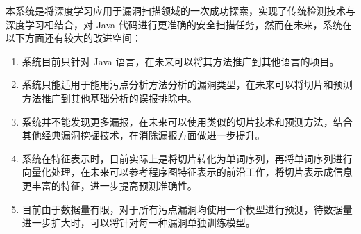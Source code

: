 本系统是将深度学习应用于漏洞扫描领域的一次成功探索，实现了传统检测技术与深度学习相结合，对 Java 代码进行更准确的安全扫描任务，然而在未来，系统在以下方面还有较大的改进空间：

\begin{enumerate}
    \item 系统目前只针对 Java 语言，在未来可以将其方法推广到其他语言的项目。
    \item 系统只能适用于能用污点分析方法分析的漏洞类型，在未来可以将切片和预测方法推广到其他基础分析的误报排除中。
    \item 系统并不能发现更多漏报，在未来可以使用类似的切片技术和预测方法，结合其他经典漏洞挖掘技术，在消除漏报方面做进一步提升。
    \item 系统在特征表示时，目前实际上是将切片转化为单词序列，再将单词序列进行向量化处理，在未来可以参考程序图特征表示的前沿工作，将切片表示成信息更丰富的特征，进一步提高预测准确性。
    \item 目前由于数据量有限，对于所有污点漏洞均使用一个模型进行预测，待数据量进一步扩大时，可以将针对每一种漏洞单独训练模型。
\end{enumerate}